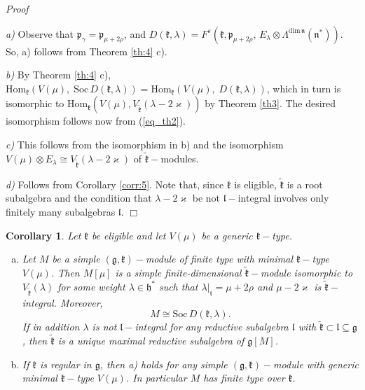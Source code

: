 \documentclass[10pt]{amsart}
\newtheorem{cor}[theo]{Corollary}
\renewenvironment{proof}{ \emph{Proof}}{$\Box$}
\newcommand{\Soc}{\mathrm{Soc}}
\newcommand{\Hom}{\mathrm{Hom}}
\renewcommand{\gg}{\mathfrak{g}}
\newcommand{\hh}{\mathfrak{h}}
\newcommand{\kk}{\mathfrak{k}}
\renewcommand{\ll}{\mathfrak{l}}
\newcommand{\nn}{\mathfrak{n}}
\newcommand{\pp}{\mathfrak{p}}
\renewcommand{\tt}{\mathfrak{t}}
\begin{document}
\begin{proof}

    \textit{a)} Observe that $\pp_{\gamma} = \pp_{\mu+2\rho}$, and $D(\kk,\lambda)=F^s(\kk,\pp_{\mu+2\rho},\,E_{\lambda} \otimes \Lambda^{\mathrm{dim}\,\nn}(\nn^*))$. So, a) follows from Theorem \ref{th:4} c).

\vspace{0.3cm}

 \textit{b)} By Theorem \ref{th:4} c), $\Hom_{\kk}(V(\mu),\;\Soc\,D(\kk,\lambda)) = \Hom_{\kk}(V(\mu),\;D(\kk,\lambda))$, which in turn is isomorphic to $\Hom_{\kk}(V(\mu),V_{\tilde{\kk}}(\lambda-2\varkappa))$ by Theorem \ref{th3}. The desired isomorphism follows now from (\ref{eq_th2}).

\vspace{0.3cm}

 \textit{c)} This follows from the isomorphism in b) and the isomorphism $V(\mu) \otimes E_{\lambda} \cong V_{\tilde{\kk}}(\lambda-2\varkappa)$ of $\tilde{\kk}-$modules.
 
 \vspace{0.3cm}
 
 \textit{d)} Follows from Corollary \ref{corr:5}. Note that, since $\kk$ is eligible, $\tilde{\kk}$ is a root subalgebra and the condition that $\lambda - 2\varkappa$ be not $\ll-$integral involves only finitely many subalgebras $\ll$. 
\end{proof}

\begin{cor}\label{corr:9}
 Let $\kk$ be eligible and let $V(\mu)$ be a generic $\kk-$type.
      \begin{enumerate}[a)]
       \item Let $M$ be a simple $(\gg,\kk)-$module of finite type with minimal $\kk-$type $V(\mu)$. Then $M[\mu]$ is a simple finite-dimensional $\tilde{\kk}-$module isomorphic to $V_{\tilde{\kk}}(\lambda)$ for some weight $\lambda \in \hh^*$ such that $\lambda|_{\tt} = \mu + 2\rho$ and $\mu - 2\varkappa$ is $\tilde{\kk}-$integral. Moreover,$$M \cong \Soc\,D(\kk,\lambda).$$
       If in addition $\lambda$ is not $\ll-$integral for any reductive subalgebra $\ll$ with $\tilde{\kk} \subset \ll \subseteq \gg$, then $\tilde{\kk}$ is a unique maximal reductive subalgebra of $\gg[M]$.
       
	\item If $\kk$ is regular in $\gg$, then a) holds for any simple $(\gg,\kk)-$module with generic minimal $\kk-$type $V(\mu)$. In particular $M$ has finite type over $\kk$.
      \end{enumerate}
\end{cor}
\end{document}
